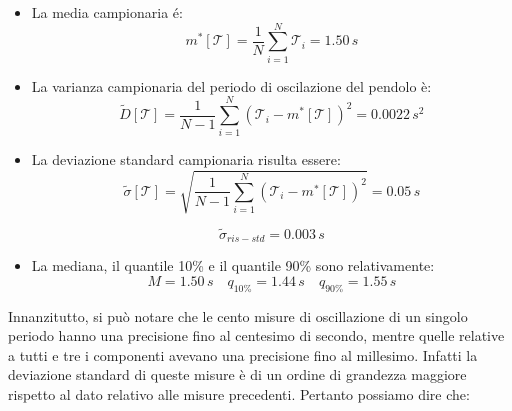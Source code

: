 \begin{itemize}
    \item{La media campionaria é:}
        \begin{equation}
            m^*[\mathcal{T}] = \frac{1}{N} \sum_{i=1}^{N} \mathcal{T}_i = 1.50\,s
        \end{equation} 

    \item{La varianza campionaria del periodo di oscilazione del pendolo è:}
        \begin{equation}
            \tilde{D}[\mathcal{T}] = \frac{1}{N - 1} \sum_{i=1}^{N} (\mathcal{T}_i - m^*[\mathcal{T}])^2 = 0.0022\,s^2
        \end{equation}

    \item{La deviazione standard campionaria risulta essere:}
        \begin{equation}
            \tilde{\sigma}[\mathcal{T}] = \sqrt{\frac{1}{N - 1} \sum_{i=1}^{N} (\mathcal{T}_i - m^*[\mathcal{T}])^2} = 0.05\,s
        \end{equation}

        \begin{equation}
            \tilde{\sigma}_{ris-std} = 0.003\,s
        \end{equation}

    \item{La mediana, il quantile 10\% e il quantile 90\% sono relativamente:}
        \begin{equation*}
            M = 1.50\,s \quad
            q_{10\%} = 1.44\,s \quad
            q_{90\%} = 1.55\,s
        \end{equation*}
\end{itemize}

Innanzitutto, si può notare che le cento misure di oscillazione di un singolo periodo hanno una precisione fino al centesimo di secondo, mentre quelle relative a tutti e tre i componenti avevano una precisione fino al millesimo. Infatti la deviazione standard di queste misure è di un ordine di grandezza maggiore rispetto al dato relativo alle misure precedenti.
Pertanto possiamo dire che:

